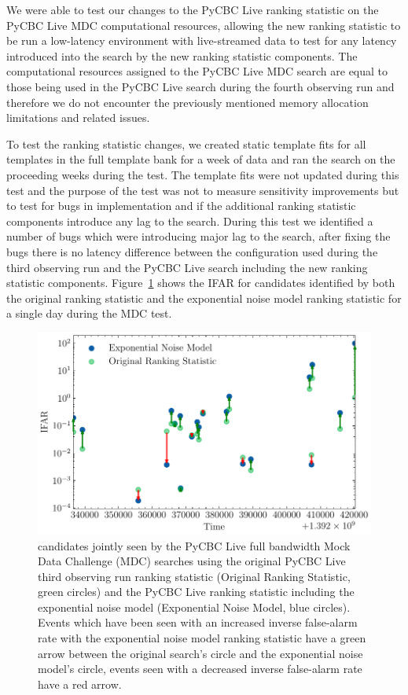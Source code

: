 We were able to test our changes to the PyCBC Live ranking statistic on the PyCBC Live MDC computational resources, allowing the new ranking statistic to be run a low-latency environment with live-streamed data to test for any latency introduced into the search by the new ranking statistic components. The computational resources assigned to the PyCBC Live MDC search are equal to those being used in the PyCBC Live search during the fourth observing run and therefore we do not encounter the previously mentioned memory allocation limitations and related issues.

To test the ranking statistic changes, we created static template fits for all templates in the full template bank for a week of data and ran the search on the proceeding weeks during the test. The template fits were not updated during this test and the purpose of the test was not to measure sensitivity improvements but to test for bugs in implementation and if the additional ranking statistic components introduce any lag to the search. During this test we identified a number of bugs which were introducing major lag to the search, after fixing the bugs there is no latency difference between the configuration used during the third observing run and the PyCBC Live search including the new ranking statistic components. Figure~\ref{5:fig:mdc_results} shows the IFAR for \gwadj candidates identified by both the original ranking statistic and the exponential noise model ranking statistic for a single day during the MDC test.
%
\begin{figure}
    \centering
    \includegraphics[width=1.0\linewidth]{images/5_pycbclive/plots/mdc_ifar_candidates.pdf}
    \caption{\Gwadj candidates jointly seen by the PyCBC Live full bandwidth Mock Data Challenge (MDC) searches using the original PyCBC Live third observing run ranking statistic (Original Ranking Statistic, green circles) and the PyCBC Live ranking statistic including the exponential noise model (Exponential Noise Model, blue circles). Events which have been seen with an increased inverse false-alarm rate with the exponential noise model ranking statistic have a green arrow between the original search's circle and the exponential noise model's circle, events seen with a decreased inverse false-alarm rate have a red arrow.}
    \label{5:fig:mdc_results}
\end{figure}
%





